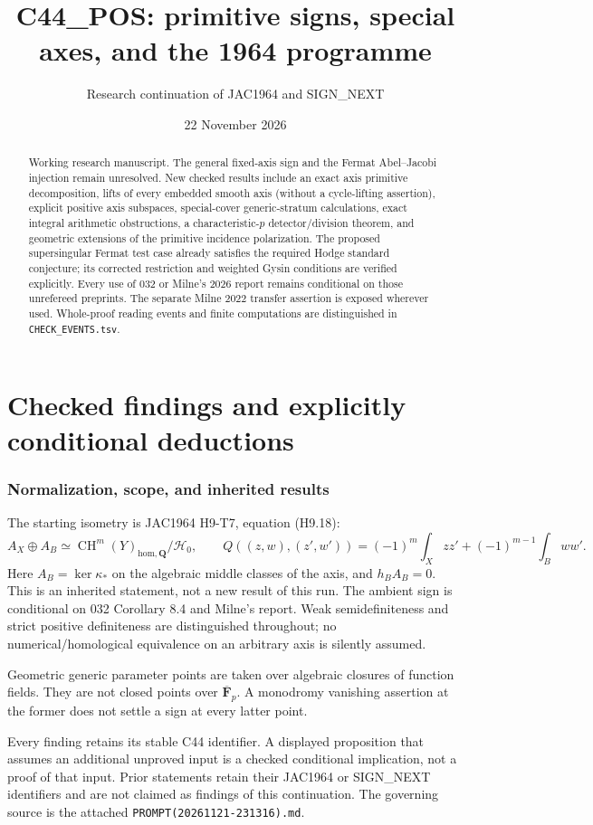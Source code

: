 \documentclass[11pt]{article}
\title{C44\_POS: primitive signs, special axes, and the 1964 programme}
\author{Research continuation of JAC1964 and SIGN\_NEXT}
\date{22 November 2026}
\theoremstyle{remark}\newtheorem{remark}[theorem]{Remark}
\DeclareMathOperator{\CH}{CH}
\newcommand{\Q}{\mathbf Q}\newcommand{\Z}{\mathbf Z}\newcommand{\F}{\mathbf F}
\begin{document}
\maketitle
\begin{abstract}
Working research manuscript. The general fixed-axis sign and the Fermat
Abel--Jacobi injection remain unresolved. New checked results include
an exact axis primitive decomposition, lifts of every embedded smooth
axis (without a cycle-lifting assertion), explicit positive axis
subspaces, special-cover generic-stratum calculations, exact integral
arithmetic obstructions, a characteristic-$p$ detector/division theorem,
and geometric extensions of the primitive incidence polarization.
The proposed supersingular Fermat test case already satisfies the
required Hodge standard conjecture; its corrected restriction and
weighted Gysin conditions are verified explicitly.
Every use of 032 or Milne's 2026 report remains conditional on those
unrefereed preprints. The separate Milne 2022 transfer assertion is
exposed wherever used. Whole-proof reading events and finite
computations are distinguished in \texttt{CHECK\_EVENTS.tsv}.
\end{abstract}
\tableofcontents
\part{Checked findings and explicitly conditional deductions}
\section{Normalization, scope, and inherited results}
The starting isometry is JAC1964 H9-T7, equation (H9.18):
\[
 A_X\oplus A_B\simeq\CH^m(Y)_{\mathrm{hom},\Q}/\mathcal H_0,
 \qquad Q((z,w),(z',w'))=(-1)^m\int_Xzz'+(-1)^{m-1}\int_Bww'.
\]
Here $A_B=\ker\kappa_*$ on the algebraic middle classes of the axis,
and $h_BA_B=0$. This is an inherited statement, not a new result of
this run. The ambient sign is conditional on 032 Corollary 8.4 and
Milne's report. Weak semidefiniteness and strict positive definiteness
are distinguished throughout; no numerical/homological equivalence
on an arbitrary axis is silently assumed.

Geometric generic parameter points are taken over algebraic closures
of function fields. They are not closed points over
$\overline{\mathbf F}_p$. A monodromy vanishing assertion at the
former does not settle a sign at every latter point.

Every finding retains its stable C44 identifier. A displayed
proposition that assumes an additional unproved input is a checked
conditional implication, not a proof of that input. Prior statements
retain their JAC1964 or SIGN\_NEXT identifiers and are not claimed
as findings of this continuation. The governing source is the attached
\texttt{PROMPT(20261121-231316).md}.
\end{document}
